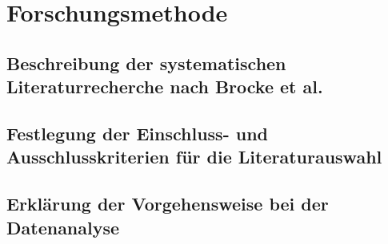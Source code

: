 \section{Forschungsmethode}
\subsection{Beschreibung der systematischen Literaturrecherche nach Brocke et al.}
\subsection{Festlegung der Einschluss- und Ausschlusskriterien für die Literaturauswahl}
\subsection{Erklärung der Vorgehensweise bei der Datenanalyse}